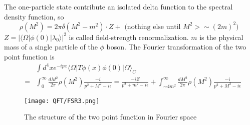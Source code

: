 The one-particle state contribute an isolated delta function to the spectral density function, so
\[\rho(M^2) = 2\pi \delta (M^2 -m^2) \cdot Z + \mbox{ (nothing else until $M^2 > \sim (2m)^2$) }\]
$Z = |\langle \Omega | \phi(0) | \lambda_0 \rangle|^2$ is called field-strength renormalization. $m$ is the physical mass of a single particle of the $\phi$ boson. The Fourier transformation of the two point function is
\begin{eqnarray}
&\phantom{=}& \int d^4x e^{-ipx} \langle \Omega | T \phi(x) \phi(0) | \Omega \rangle_C \nonumber \\  
&=& \int_{0}^{\infty} \frac{dM^2}{2\pi} \rho(M^2) \frac{-i}{p^2+M^2-i\epsilon} = \frac{-iZ}{p^2+m^2-i\epsilon} +  \int_{\sim 4m^2}^{\infty} \frac{dM^2}{2\pi} \rho(M^2) \frac{-i}{p^2+M^2-i\epsilon} \nonumber
\end{eqnarray}
\begin{figure}[!h]
\centering
\texttt{[image: QFT/FSR3.png]}
\caption{The structure of the two point function in Fourier space}
\end{figure}
\vspace{80pt}
